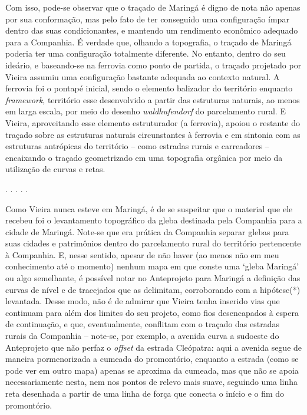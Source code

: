 \documentclass[12pt, a4paper]{book} %
\begin{document}
        Com isso, pode-se observar que o traçado de Maringá é digno de nota não apenas por sua conformação, mas pelo fato de ter conseguido uma configuração ímpar dentro das suas condicionantes, e mantendo um rendimento econômico adequado para a Companhia. É verdade que, olhando a topografia, o traçado de Maringá poderia ter uma configuração totalmente diferente. No entanto, dentro do seu ideário, e baseando-se na ferrovia como ponto de partida, o traçado projetado por Vieira assumiu uma configuração bastante adequada ao contexto natural. A ferrovia foi o pontapé inicial, sendo o elemento balizador do território enquanto \textit{framework}, território esse desenvolvido a partir das estruturas naturais, ao menos em larga escala, por meio do desenho \textit{waldhufendorf} do parcelamento rural. E Vieira, aproveitando esse elemento estruturador (a ferrovia), apoiou o restante do traçado sobre as estruturas naturais circunstantes à ferrovia e em sintonia com as estruturas antrópicas do território – como estradas rurais e carreadores – encaixando o traçado geometrizado em uma topografia orgânica por meio da utilização de curvas e retas.

        \begin{center}
        . . . . .
        \end{center} 

        Como Vieira nunca esteve em Maringá, é de se suspeitar que o material que ele recebeu foi o levantamento topográfico da gleba destinada pela Companhia para a cidade de Maringá. Note-se que era prática da Companhia separar glebas para suas cidades e patrimônios dentro do parcelamento rural do território pertencente à Companhia. E, nesse sentido, apesar de não haver (ao menos não em meu conhecimento até o momento) nenhum mapa em que conste uma `gleba Maringá' ou algo semelhante, é possível notar no Anteprojeto para Maringá a definição das curvas de nível e de tracejados que as delimitam, corroborando com a hipótese(*) levantada. Desse modo, não é de admirar que Vieira tenha inserido vias que continuam para além dos limites do seu projeto, como fios desencapados à espera de continuação, e que, eventualmente, conflitam com o traçado das estradas rurais da Companhia – note-se, por exemplo, a avenida curva a sudoeste do Anteprojeto que não perfaz o \textit{offset} da estrada Cleópatra: aqui a avenida segue de maneira pormenorizada a cumeada do promontório, enquanto a estrada (como se pode ver em outro mapa) apenas se aproxima da cumeada, mas que não se apoia necessariamente nesta, nem nos pontos de relevo mais suave, seguindo uma linha reta desenhada a partir de uma linha de força que conecta o início e o fim do promontório.
\end{document}
